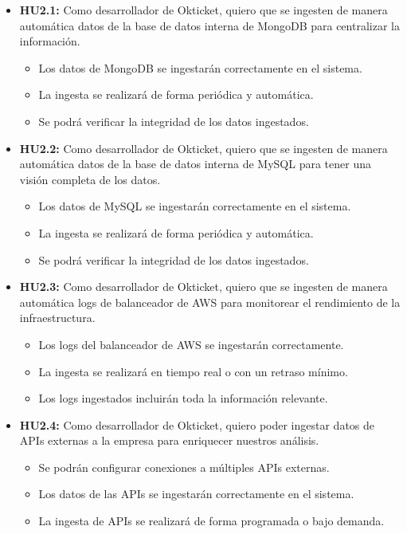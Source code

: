 \begin{itemize}
    \item \textbf{HU2.1:} Como desarrollador de Okticket, quiero que se
    ingesten de manera automática datos de la base de datos interna de MongoDB
    para centralizar la información.
    \begin{itemize}
        \item Los datos de MongoDB se ingestarán correctamente en el sistema.
        \item La ingesta se realizará de forma periódica y automática.
        \item Se podrá verificar la integridad de los datos ingestados.
    \end{itemize}

    \item \textbf{HU2.2:} Como desarrollador de Okticket, quiero que se
    ingesten de manera automática datos de la base de datos interna de MySQL
    para tener una visión completa de los datos.
    \begin{itemize}
        \item Los datos de MySQL se ingestarán correctamente en el sistema.
        \item La ingesta se realizará de forma periódica y automática.
        \item Se podrá verificar la integridad de los datos ingestados.
    \end{itemize}

    \item \textbf{HU2.3:} Como desarrollador de Okticket, quiero que se
    ingesten de manera automática logs de balanceador de AWS para monitorear
    el rendimiento de la infraestructura.
    \begin{itemize}
        \item Los logs del balanceador de AWS se ingestarán correctamente.
        \item La ingesta se realizará en tiempo real o con un retraso mínimo.
        \item Los logs ingestados incluirán toda la información relevante.
    \end{itemize}

    \item \textbf{HU2.4:} Como desarrollador de Okticket, quiero poder ingestar
    datos de APIs externas a la empresa para enriquecer nuestros análisis.
    \begin{itemize}
        \item Se podrán configurar conexiones a múltiples APIs externas.
        \item Los datos de las APIs se ingestarán correctamente en el sistema.
        \item La ingesta de APIs se realizará de forma programada o bajo demanda.
    \end{itemize}


\end{itemize}
